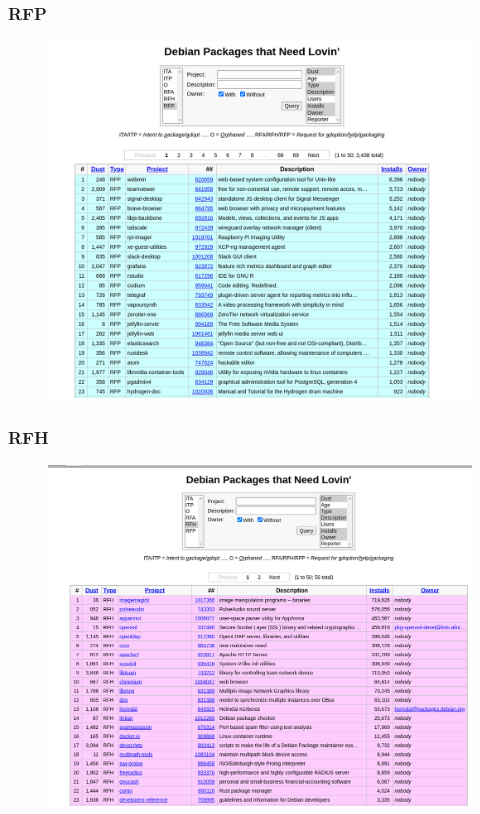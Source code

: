 \documentclass{beamer}
\begin{document}
\begin{frame}
 \frametitle{RFP}
    \begin{figure}
		\centering
		\includegraphics[width=0.7\linewidth]{images/rfp}
		\label{fig:rfp}
	\end{figure}
\end{frame}

\begin{frame}
 \frametitle{RFH}
    \begin{figure}
		\centering
		\includegraphics[width=0.7\linewidth]{images/rfh}
		\label{fig:rfh}
	\end{figure}
\end{frame}
\end{document}
